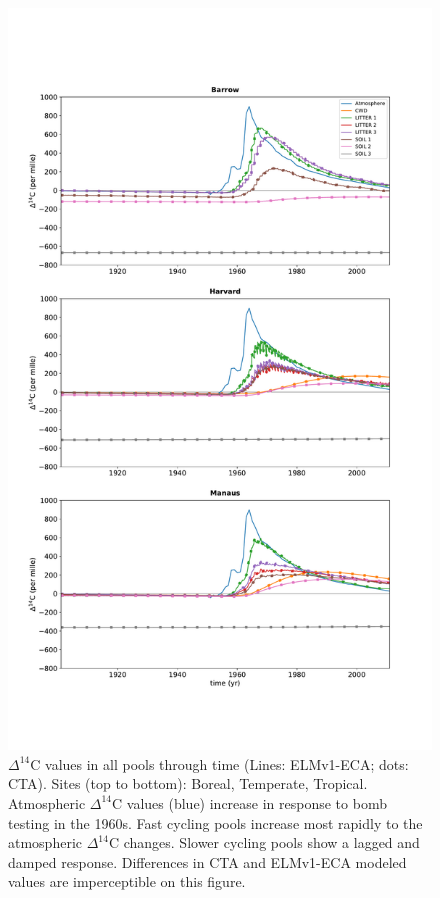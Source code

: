 \documentclass[11pt,a4paper]{article}
\begin{document}
\begin{figure}[htbp]
        \centering 
        \vspace{-8em}
        \includegraphics[width=1.0\linewidth]{figs/Delta_14C_through_time_per_pools_10.pdf}
        \vspace{-4em}
        \caption{$\Delta^{14}$C values in all pools through time (Lines: ELMv1-ECA; dots: CTA). Sites (top to bottom): Boreal, Temperate, Tropical. Atmospheric $\Delta^{14}$C values (blue) increase in response to bomb testing in the 1960s. Fast cycling pools increase most rapidly to the atmospheric $\Delta^{14}$C changes. Slower cycling pools show a lagged and damped response. Differences in CTA and ELMv1-ECA modeled values are imperceptible on this figure.
            }
        \label{fig:poolsOverTime}
    \end{figure}    
    
\end{document}
